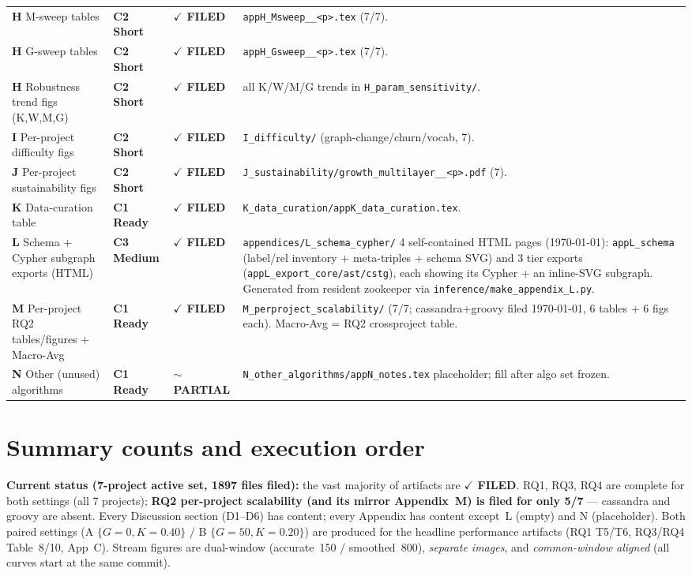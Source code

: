 \documentclass[10pt]{article}
\providecommand{\code}[1]{\texttt{\small #1}}
\newcommand{\Cone}{\textcolor{green!50!black}{\textbf{C1 Ready}}}
\newcommand{\Ctwo}{\textcolor{blue!65!black}{\textbf{C2 Short}}}
\newcommand{\Cthree}{\textcolor{orange!85!black}{\textbf{C3 Medium}}}
\newcommand{\DONE}{\textcolor{green!45!black}{\textbf{$\checkmark$ FILED}}}
\newcommand{\PARTIAL}{\textcolor{orange!85!black}{\textbf{$\sim$ PARTIAL}}}
\begin{document}
\begin{longtable}{p{7.0cm}p{1.4cm}p{1.6cm}p{5.4cm}}
\textbf{H} M-sweep tables & \Ctwo & \DONE & \code{appH\_Msweep\_\_<p>.tex} (7/7). \\
\textbf{H} G-sweep tables & \Ctwo & \DONE & \code{appH\_Gsweep\_\_<p>.tex} (7/7). \\
\textbf{H} Robustness trend figs (K,W,M,G) & \Ctwo & \DONE & all K/W/M/G trends in \code{H\_param\_sensitivity/}. \\
\textbf{I} Per-project difficulty figs & \Ctwo & \DONE & \code{I\_difficulty/} (graph-change/churn/vocab, 7). \\
\textbf{J} Per-project sustainability figs & \Ctwo & \DONE & \code{J\_sustainability/growth\_multilayer\_\_<p>.pdf} (7). \\
\textbf{K} Data-curation table & \Cone & \DONE & \code{K\_data\_curation/appK\_data\_curation.tex}. \\
\textbf{L} Schema + Cypher subgraph exports (HTML) & \Cthree & \DONE & \code{appendices/L\_schema\_cypher/} 4 self-contained HTML pages (\today): \code{appL\_schema} (label/rel inventory + meta-triples + schema SVG) and 3 tier exports (\code{appL\_export\_core/ast/cstg}), each showing its Cypher + an inline-SVG subgraph. Generated from resident zookeeper via \code{inference/make\_appendix\_L.py}. \\
\textbf{M} Per-project RQ2 tables/figures + Macro-Avg & \Cone & \DONE & \code{M\_perproject\_scalability/} (7/7; cassandra+groovy filed \today, 6 tables + 6 figs each). Macro-Avg = RQ2 crossproject table. \\
\textbf{N} Other (unused) algorithms & \Cone & \PARTIAL & \code{N\_other\_algorithms/appN\_notes.tex} placeholder; fill after algo set frozen. \\
\bottomrule
\end{longtable}

\section*{Summary counts and execution order}
\textbf{Current status (7-project active set, 1897 files filed):} the vast
majority of artifacts are \DONE. RQ1, RQ3, RQ4 are complete for both settings (all 7
projects); \textbf{RQ2 per-project scalability (and its mirror Appendix~M) is filed
for only 5/7} --- cassandra and groovy are absent. Every Discussion section (D1--D6)
has content; every Appendix has content except~L (empty) and N (placeholder). Both
paired settings (A $\{G{=}0,K{=}0.40\}$ / B $\{G{=}50,K{=}0.20\}$) are produced for the
headline performance artifacts (RQ1 T5/T6, RQ3/RQ4 Table~8/10, App~C). Stream figures
are dual-window (accurate~150 / smoothed~800), \emph{separate images}, and
\emph{common-window aligned} (all curves start at the same commit).
\end{document}
